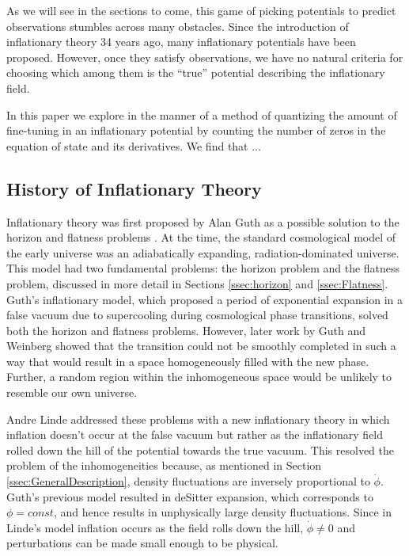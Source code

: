 \documentclass[onecolumn,apj]{emulateapj}
\begin{document}
As we will see in the sections to come, this game of picking potentials to predict observations stumbles across many obstacles. Since the introduction of inflationary theory 34 years ago, many inflationary potentials have been proposed. However, once they satisfy observations, we have no natural criteria for choosing which among them is the ``true'' potential describing the inflationary field. 

In this paper we explore in the manner of \citet{Boyle+2006} a method of quantizing the amount of fine-tuning in an inflationary potential by counting the number of zeros in the equation of state and its derivatives. We find that ...

\subsection{History of Inflationary Theory}
\label{ssec:History}
Inflationary theory was first proposed by Alan Guth as a possible solution to the horizon and flatness problems \citep{Guth1981}. At the time, the standard cosmological model of the early universe was an adiabatically expanding, radiation-dominated universe. This model had two fundamental problems: the horizon problem and the flatness problem, discussed in more detail in Sections \ref{ssec:horizon} and \ref{ssec:Flatness}. Guth's inflationary model, which proposed a period of exponential expansion in a false vacuum due to supercooling during cosmological phase transitions, solved both the horizon and flatness problems.  However, later work by Guth and Weinberg \citep{Guth+Weinberg1983} showed that the transition could not be smoothly completed in such a way that would result in a space homogeneously filled with the new phase. Further, a random region within the inhomogeneous space would be unlikely to resemble our own universe. 

Andre Linde addressed these problems with a new inflationary theory in which inflation doesn't occur at the false vacuum but rather as the inflationary field rolled down the hill of the potential towards the true vacuum. This resolved the problem of the inhomogeneities because, as mentioned in Section \ref{ssec:GeneralDescription}, density fluctuations are inversely proportional to $\dot \phi$. Guth's previous model resulted in deSitter expansion, which corresponds to $\phi=const$, and hence results in unphysically large density fluctuations. Since in Linde's model inflation occurs as the field rolls down the hill, $\dot \phi \neq 0$ and perturbations can be made small enough to be physical. 
\end{document}
